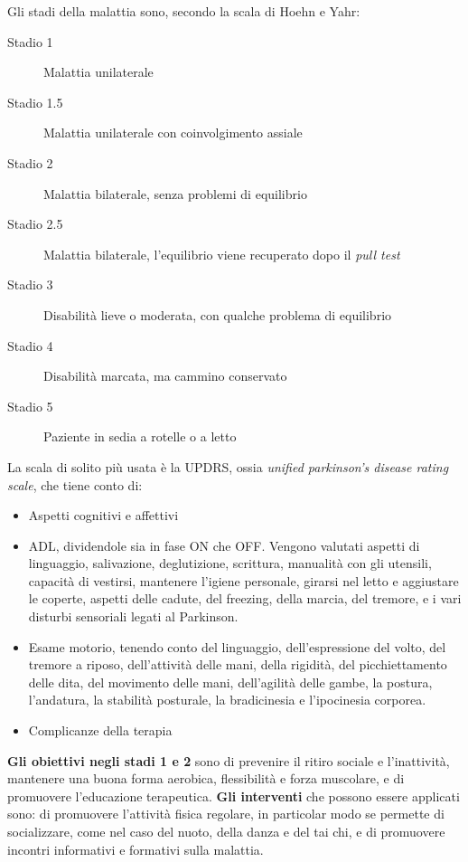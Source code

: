Gli stadi della malattia sono, secondo la scala di Hoehn e Yahr:
\begin{description}
\item [Stadio 1] Malattia unilaterale
\item [Stadio 1.5] Malattia unilaterale con coinvolgimento assiale
\item [Stadio 2] Malattia bilaterale, senza problemi di equilibrio
\item [Stadio 2.5] Malattia bilaterale, l'equilibrio viene recuperato dopo il
\textit{pull test}
\item [Stadio 3] Disabilità lieve o moderata, con qualche problema di equilibrio
\item [Stadio 4] Disabilità marcata, ma cammino conservato
\item [Stadio 5] Paziente in sedia a rotelle o a letto
\end{description}

La scala di solito più usata è la UPDRS, ossia \textit{unified parkinson's
disease rating scale}, che tiene conto di:
\begin{itemize}
\item Aspetti cognitivi e affettivi
\item ADL, dividendole sia in fase ON che OFF. Vengono valutati aspetti di
linguaggio, salivazione, deglutizione, scrittura, manualità con gli utensili,
capacità di vestirsi, mantenere l'igiene personale, girarsi nel letto e
aggiustare le coperte, aspetti delle cadute, del freezing, della marcia,
del tremore, e i vari disturbi sensoriali legati al Parkinson.
\item Esame motorio, tenendo conto del linguaggio, dell'espressione del volto,
del tremore a riposo, dell'attività delle mani, della rigidità, del
picchiettamento delle dita, del movimento delle mani, dell'agilità delle gambe,
la postura, l'andatura, la stabilità posturale, la bradicinesia e l'ipocinesia
corporea.
\item Complicanze della terapia
\end{itemize}

\textbf{Gli obiettivi negli stadi 1 e 2} sono di prevenire il ritiro sociale e 
l'inattività, mantenere una buona forma aerobica, flessibilità e forza muscolare,
e di promuovere l'educazione terapeutica. \textbf{Gli interventi} che possono
essere applicati sono: di promuovere l'attività fisica regolare, in particolar
modo se permette di socializzare, come nel caso del nuoto, della danza e del tai
chi, e di promuovere incontri informativi e formativi sulla malattia.


